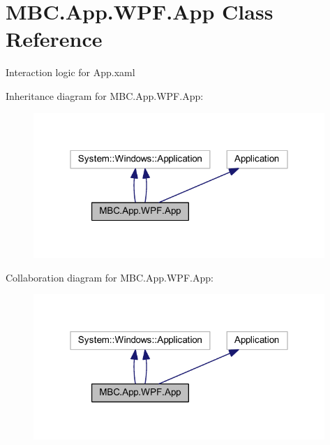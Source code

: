 \hypertarget{class_m_b_c_1_1_app_1_1_w_p_f_1_1_app}{\section{M\-B\-C.\-App.\-W\-P\-F.\-App Class Reference}
\label{class_m_b_c_1_1_app_1_1_w_p_f_1_1_app}
}


Interaction logic for App.\-xaml  




Inheritance diagram for M\-B\-C.\-App.\-W\-P\-F.\-App\-:
\nopagebreak
\begin{figure}[H]
\begin{center}
\leavevmode
\includegraphics[width=313pt]{class_m_b_c_1_1_app_1_1_w_p_f_1_1_app__inherit__graph}
\end{center}
\end{figure}


Collaboration diagram for M\-B\-C.\-App.\-W\-P\-F.\-App\-:
\nopagebreak
\begin{figure}[H]
\begin{center}
\leavevmode
\includegraphics[width=313pt]{class_m_b_c_1_1_app_1_1_w_p_f_1_1_app__coll__graph}
\end{center}
\end{figure}
